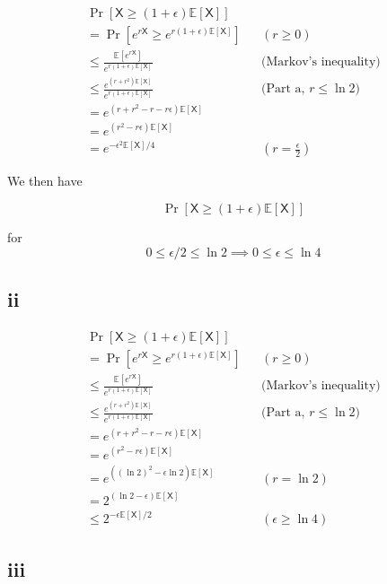 \documentclass{article}
\newcommand{\E}{\mathbb{E}}
\newcommand{\rX}{\mathsf{X}}
\begin{document}


\begin{align}
    \Pr[\rX \geq (1+\epsilon)\E[\rX]]  \\
    = \Pr[e^{r\rX} \geq e^{r(1+\epsilon)\E[\rX]}] && (r \geq 0) \\
    \leq \frac{\E[e^{r\rX}]}{e^{r(1+\epsilon)\E[\rX]}} && \text{(Markov's inequality)} \\
    \leq \frac{e^{(r+r^2)\E[\rX]}}{e^{r(1+\epsilon)\E[\rX]}} && \text{({Part
    a, }}r \leq \ln 2) \\
    = e^{(r+r^2 - r - r\epsilon)\E[\rX]} \\
    = e^{(r^2 - r\epsilon)\E[\rX]} \\
    = e^{-\epsilon^2\E[\rX]/4} && (r = \frac{\epsilon}{2})
\end{align}

We then have 

$$\Pr[\rX \geq (1+\epsilon)\E[\rX]]$$

for $$0 \leq\epsilon/2 \leq \ln 2 \implies 0 \leq \epsilon \leq \ln 4$$

\subsection*{ii}

\begin{align}
    \Pr[\rX \geq (1+\epsilon)\E[\rX]]  \\
    = \Pr[e^{r\rX} \geq e^{r(1+\epsilon)\E[\rX]}] && (r \geq 0) \\
    \leq \frac{\E[e^{r\rX}]}{e^{r(1+\epsilon)\E[\rX]}} && \text{(Markov's inequality)} \\
    \leq \frac{e^{(r+r^2)\E[\rX]}}{e^{r(1+\epsilon)\E[\rX]}} && \text{({Part
    a, }}r \leq \ln 2) \\
    = e^{(r+r^2 - r - r\epsilon)\E[\rX]} \\
    = e^{(r^2 - r\epsilon)\E[\rX]} \\
    = e^{((\ln2)^2-\epsilon\ln2)\E[\rX]} && (r = \ln 2)\\
    = 2^{(\ln2-\epsilon)\E[\rX]}\\
    \leq 2^{-\epsilon\E[\rX]/2} && (\epsilon \geq \ln 4)
\end{align}

\subsection*{iii}
\end{document}
